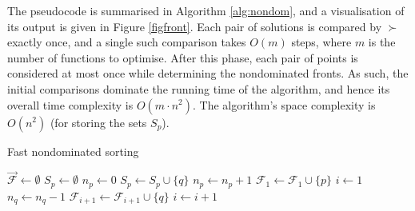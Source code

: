 \documentclass[12pt,a4paper,twoside,openright]{report}
\begin{document}
The pseudocode is summarised in Algorithm \ref{alg:nondom}, and a visualisation of its output is given in Figure \ref{figfront}. Each pair of solutions is compared by $\succ$ exactly once, and a single such comparison takes $O(m)$ steps, where $m$ is the number of functions to optimise. After this phase, each pair of points is considered at most once while determining the nondominated fronts. As such, the initial comparisons dominate the running time of the algorithm, and hence its overall time complexity is $O(m\cdot n^2)$. The algorithm's space complexity is $O(n^2)$ (for storing the sets $S_p$).
\begin{algorithm}[H]
\caption{Fast nondominated sorting}\label{alg:nondom}
\begin{algorithmic}[1]
 
	\State $\vec{\mathcal{F}}\gets \emptyset$ 
		\State $S_p\gets\emptyset$ 
		\State $n_p\gets 0$
			 $S_p\gets S_p\cup \{q\}$ 
			 $n_p\gets n_p + 1$
			\EndIf
		\EndFor
		 $\mathcal{F}_1\gets\mathcal{F}_1\cup \{p\}$ 
		\EndIf
	\EndFor
	\State $i\gets 1$
	 
				\State $n_q\gets n_q - 1$ 
				 $\mathcal{F}_{i+1}\gets \mathcal{F}_{i+1}\cup\{q\}$
				\EndIf
			\EndFor
		\EndFor
		\State $i\gets i+1$
	\EndWhile
	\State {}
\EndFunction
{}
\end{algorithmic}
\end{algorithm}
\end{document}
